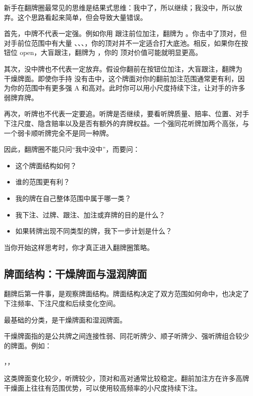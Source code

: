 新手在翻牌圈最常见的思维是结果式思维：我中了，所以继续；我没中，所以放弃。这个思路看起来简单，但会导致大量错误。

首先，中牌不代表一定强。例如你用  跟注前位加注，翻牌为 。你击中了顶对，但对手前位范围中有大量 、、、，你的顶对并不一定适合打大底池。相反，如果你在按钮位 open，大盲跟注，翻牌为 ，你的  顶对价值可能就明显更高。

其次，没中牌也不代表一定放弃。假设你翻前在按钮位加注，大盲跟注，翻牌为  干燥牌面。即使你手持  没有击中，这个牌面对你的翻前加注范围通常更有利，因为你的范围中有更多强 A 和高对。此时你可以用小尺度持续下注，让对手的许多弱牌弃牌。

再次，听牌也不代表一定要追。听牌是否继续，要看听牌质量、赔率、位置、对手下注尺度、隐含赔率以及是否有额外的弃牌权益。一个强同花听牌加两个高张，与一个弱卡顺听牌完全不是同一种牌。

因此，翻牌圈不能只问“我中没中”，而要问：

\begin{itemize}
\item 这个牌面结构如何？
\item 谁的范围更有利？
\item 我的牌在自己整体范围中属于哪一类？
\item 我下注、过牌、跟注、加注或弃牌的目的是什么？
\item 如果转牌出现不同类型的牌，我下一步计划是什么？
\end{itemize}

当你开始这样思考时，你才真正进入翻牌圈策略。

\subsection{牌面结构：干燥牌面与湿润牌面}

翻牌后第一件事，是观察牌面结构。牌面结构决定了双方范围如何命中，也决定了下注频率、下注尺度和后续变化空间。

最基础的分类，是干燥牌面和湿润牌面。

干燥牌面指的是公共牌之间连接性弱、同花听牌少、顺子听牌少、强听牌组合较少的牌面。例如：

\begin{center}
，，
\end{center}

这类牌面变化较少，听牌较少，顶对和高对通常比较稳定。翻前加注方在许多高牌干燥面上往往有范围优势，可以使用较高频率的小尺度持续下注。

